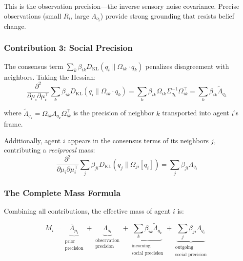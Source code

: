 \documentclass[12pt]{article}
\begin{document}
This is the observation precision—the inverse sensory noise covariance. Precise observations (small $R_i$, large $\Lambda_{o_i}$) provide strong grounding that resists belief change.


\subsubsection{Contribution 3: Social Precision}

The consensus term $\sum_k \beta_{ik} D_{\mathrm{KL}}(q_i \| \Omega_{ik}\cdot q_k)$ penalizes disagreement with neighbors. Taking the Hessian:
\begin{equation}
\frac{\partial^2}{\partial\mu_i\partial\mu_i^\top} \sum_k \beta_{ik} D_{\mathrm{KL}}(q_i \| \Omega_{ik}\cdot q_k) = \sum_k \beta_{ik} \Omega_{ik} \Sigma_{q_k}^{-1} \Omega_{ik}^\top = \sum_k \beta_{ik} \tilde{\Lambda}_{q_k}
\end{equation}

where $\tilde{\Lambda}_{q_k} = \Omega_{ik}\Lambda_{q_k}\Omega_{ik}^\top$ is the precision of neighbor $k$ transported into agent $i$'s frame.

Additionally, agent $i$ appears in the consensus terms of its neighbors $j$, contributing a \textit{reciprocal} mass:
\begin{equation}
\frac{\partial^2}{\partial\mu_i\partial\mu_i^\top} \sum_j \beta_{ji} D_{\mathrm{KL}}(q_j \| \Omega_{ji}[q_i]) = \sum_j \beta_{ji} \Lambda_{q_i}
\end{equation}

\subsubsection{The Complete Mass Formula}

Combining all contributions, the effective mass of agent $i$ is:

\begin{equation}
\boxed{
M_i = \underbrace{\bar{\Lambda}_{p_i}}_{\substack{\text{prior} \\ \text{precision}}} + \underbrace{\Lambda_{o_i}}_{\substack{\text{observation} \\ \text{precision}}} + \underbrace{\sum_k \beta_{ik}\tilde{\Lambda}_{q_k}}_{\substack{\text{incoming} \\ \text{social precision}}} + \underbrace{\sum_j \beta_{ji}\Lambda_{q_i}}_{\substack{\text{outgoing} \\ \text{social precision}}}
}
\end{equation}
\end{document}
